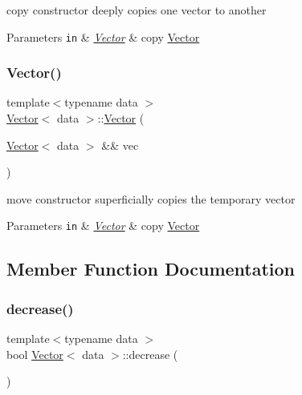 copy constructor  deeply copies one vector to another 


\begin{DoxyParams}[1]{Parameters}
\mbox{\tt in}  & {\em \hyperlink{classVector}{Vector}} & copy \hyperlink{classVector}{Vector} \\
\hline
\end{DoxyParams}
\mbox{\label{classVector_a729b947a5289bca0be614283775f0442}} 
\subsubsection{\texorpdfstring{Vector()}{Vector()}\hspace{0.1cm}{\footnotesize\ttfamily [5/5]}}
{\footnotesize\ttfamily template$<$typename data $>$ \\
\hyperlink{classVector}{Vector}$<$ data $>$\+::\hyperlink{classVector}{Vector} (\begin{DoxyParamCaption}\item[{\hyperlink{classVector}{Vector}$<$ data $>$ \&\&}]{vec }\end{DoxyParamCaption})}



move constructor  superficially copies the temporary vector 


\begin{DoxyParams}[1]{Parameters}
\mbox{\tt in}  & {\em \hyperlink{classVector}{Vector}} & copy \hyperlink{classVector}{Vector} \\
\hline
\end{DoxyParams}


\subsection{Member Function Documentation}
\mbox{\label{classVector_a770a5b403dcb82ea6954cda918d278d6}} 
\subsubsection{\texorpdfstring{decrease()}{decrease()}}
{\footnotesize\ttfamily template$<$typename data $>$ \\
bool \hyperlink{classVector}{Vector}$<$ data $>$\+::decrease (\begin{DoxyParamCaption}{ }\end{DoxyParamCaption})\hspace{0.3cm}{\ttfamily [private]}}



